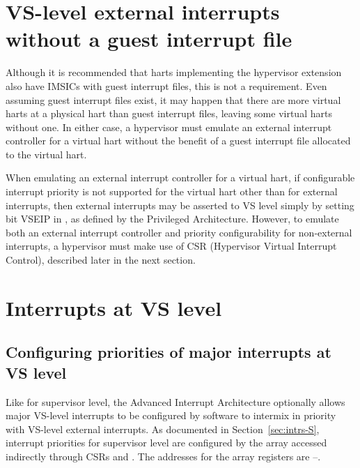 \section{VS-level external interrupts without a guest interrupt file}

Although it is recommended that harts implementing the hypervisor
extension also have IMSICs with guest interrupt files, this is not a
requirement.
Even assuming guest interrupt files exist, it may happen that there
are more virtual harts at a physical hart than guest interrupt files,
leaving some virtual harts without one.
In either case, a hypervisor must emulate an external interrupt
controller for a virtual hart without the benefit of a guest interrupt
file allocated to the virtual hart.

When emulating an external interrupt controller for a virtual hart,
if configurable interrupt priority is not supported for the virtual
hart other than for external interrupts, then external interrupts may
be asserted to VS level simply by setting bit VSEIP in , as
defined by the {\RISCV} Privileged Architecture.
However, to emulate both an external interrupt controller and priority
configurability for non-external interrupts, a hypervisor must make use
of CSR  (Hypervisor Virtual Interrupt Control), described
later in the next section.

\section{Interrupts at VS level}

\subsection{Configuring priorities of major interrupts at VS level}

Like for supervisor level, the Advanced Interrupt Architecture
optionally allows major VS-level interrupts to be configured by
software to intermix in priority with VS-level external interrupts.
As documented in Section~\ref{sec:intrs-S}, interrupt priorities
for supervisor level are configured by the  array accessed
indirectly through CSRs  and .
The  addresses for the  array registers are
--.

